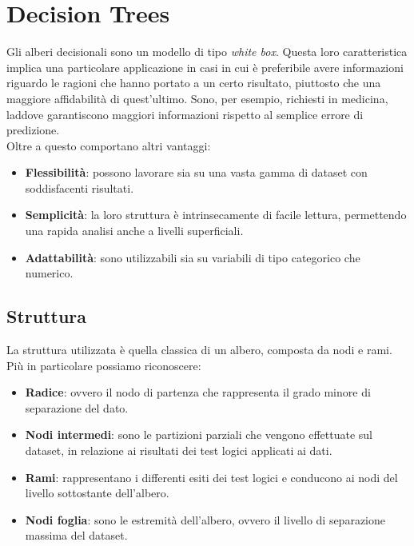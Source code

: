 \pagebreak

\section{Decision Trees}
Gli alberi decisionali sono un modello di tipo \textit{white box}. Questa loro caratteristica implica una particolare applicazione in casi in cui è preferibile avere informazioni riguardo le ragioni che hanno portato a un certo risultato, piuttosto che una maggiore affidabilità di quest'ultimo. Sono, per esempio, richiesti in medicina, laddove garantiscono maggiori informazioni rispetto al semplice errore di predizione.\\
Oltre a questo comportano altri vantaggi:
\begin{itemize}
	\item \textbf{Flessibilità}: possono lavorare sia su una vasta gamma di dataset con soddisfacenti risultati. 
	\item \textbf{Semplicità}: la loro struttura è intrinsecamente di facile lettura, permettendo una rapida analisi anche a livelli superficiali.
	\item \textbf{Adattabilità}: sono utilizzabili sia su variabili di tipo categorico che numerico.
\end{itemize}

\subsection{Struttura}
La struttura utilizzata è quella classica di un albero, composta da nodi e rami. Più in particolare possiamo riconoscere:
\begin{itemize}
	\item \textbf{Radice}: ovvero il nodo di partenza che rappresenta il grado minore di separazione del dato.
	\item \textbf{Nodi intermedi}: sono le partizioni parziali che vengono effettuate sul dataset, in relazione ai risultati dei test logici applicati ai dati.
	\item \textbf{Rami}: rappresentano i differenti esiti dei test logici e conducono ai nodi del livello sottostante dell'albero.
	\item \textbf{Nodi foglia}: sono le estremità dell'albero, ovvero il livello di separazione massima del dataset.
\end{itemize}

